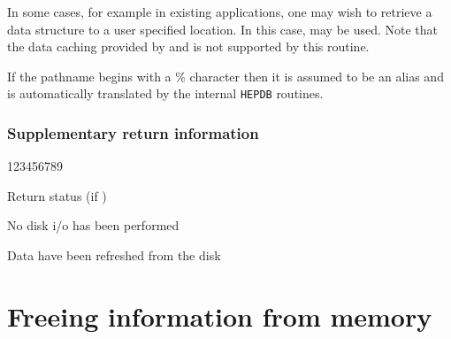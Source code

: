 In some cases, for example in existing applications, one may wish to
retrieve a data structure to a user specified location. In this
case,  may be used. Note that the data caching provided
by  and  is not supported by this routine.

If the pathname begins with a \% character then it is assumed to be
an alias and is automatically translated by the internal {\tt HEPDB}
routines.

\subsubsection*{Supplementary return information}

\begin{DLtt}{123456789}
\item[IQUEST(2)]Return status (if )
%
  \begin{DLtt}{1}
    \item[0]No disk i/o has been performed
    \item[1]Data have been refreshed from the disk
  \end{DLtt}
\end{DLtt}

\section{Freeing information from memory}


